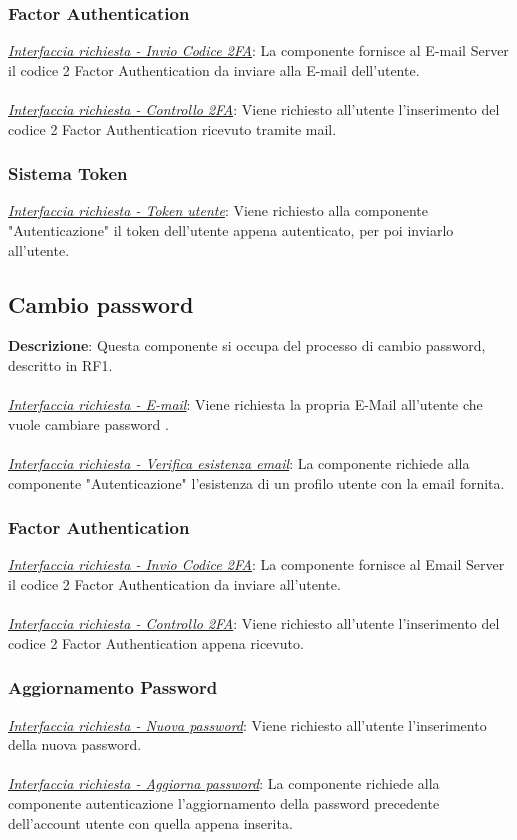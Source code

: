 \documentclass{report}
\begin{document}
\subsubsection*{\indent {} Factor Authentication}
\uline{\textit{Interfaccia richiesta - Invio Codice 2FA}}: 
La componente fornisce al E-mail Server il codice 2 Factor Authentication da inviare alla E-mail dell'utente.\\ \\
\uline{\textit{Interfaccia richiesta - Controllo 2FA}}: 
Viene richiesto all'utente l'inserimento del codice 2 Factor Authentication ricevuto tramite mail. 
\subsubsection*{\indent \indent Sistema Token}
\uline{\textit{Interfaccia richiesta - Token utente}}: 
Viene richiesto alla componente "Autenticazione" il token dell'utente appena autenticato, per poi inviarlo all'utente.

\subsection*{Cambio password}
\textbf{Descrizione}: Questa componente si occupa del processo di cambio password, descritto in RF1.\\ \\ 

\uline{\textit{Interfaccia richiesta - E-mail}}: 
Viene richiesta la propria E-Mail all'utente che vuole cambiare password .\\ \\
\uline{\textit{Interfaccia richiesta - Verifica esistenza email}}: 
La componente richiede alla componente "Autenticazione" l'esistenza di un profilo utente con la email fornita. 
\subsubsection*{\indent {} Factor Authentication}
\uline{\textit{Interfaccia richiesta - Invio Codice 2FA}}: 
La componente fornisce al Email Server il codice 2 Factor Authentication da inviare all'utente.\\ \\ 
\uline{\textit{Interfaccia richiesta - Controllo 2FA}}:
Viene richiesto all'utente l'inserimento del codice 2 Factor Authentication appena ricevuto.
\subsubsection*{\indent \indent Aggiornamento Password}
\uline{\textit{Interfaccia richiesta - Nuova password}}: 
Viene richiesto all'utente l'inserimento della nuova password.\\ \\
\uline{\textit{Interfaccia richiesta - Aggiorna password}}: 
La componente richiede alla componente autenticazione l'aggiornamento della password precedente dell'account utente con quella appena inserita.
\end{document}

